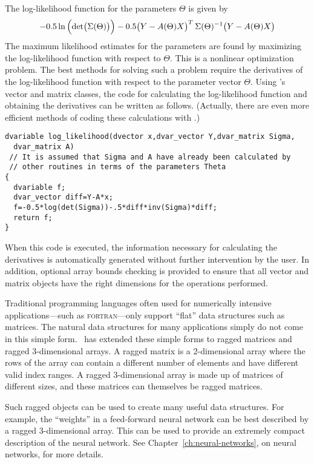 \documentclass{admbmanual}
\newcommand{\question}[1]{\bigskip\noindent{\bf #1?}\par\medskip\noindent}
\begin{document}
The log-likelihood function for the parameters $\Theta$ is given by
\begin{equation*}
  -0.5 \ln\Big(\mbox{\rm det}\big(\Sigma(\Theta)\big)\Big)-
   0.5\big(Y-A(\Theta)X\big)^T
   \,\Sigma(\Theta)^{-1}
   \big(Y-A(\Theta)X\big)
\end{equation*}
The maximum likelihood estimates for the parameters are found by maximizing the
log-likelihood function with respect to $\Theta$. This is a nonlinear
optimization problem. The best methods for solving such a problem require the
derivatives of the log-likelihood function with respect to the parameter vector
$\Theta$. Using \scAD's vector and matrix classes, the code for calculating the
log-likelihood function and obtaining the derivatives can be written as follows.
(Actually, there are even more efficient methods of coding these calculations
with \scAD.)

\begin{lstlisting}
dvariable log_likelihood(dvector x,dvar_vector Y,dvar_matrix Sigma,
  dvar_matrix A)
 // It is assumed that Sigma and A have already been calculated by
 // other routines in terms of the parameters Theta
{
  dvariable f;
  dvar_vector diff=Y-A*x;
  f=-0.5*log(det(Sigma))-.5*diff*inv(Sigma)*diff;
  return f;
}
\end{lstlisting}

When this code is executed, the information necessary for calculating the
derivatives is automatically generated without further intervention by the user.
In addition, optional array bounds checking is provided to ensure that all
vector and matrix objects have the right dimensions for the operations
performed.

\question{What are ragged arrays} Traditional programming languages often used
for numerically intensive applications---such as \textsc{fortran}---only support
``flat'' data structures such as matrices. The natural data structures for many
applications simply do not come in this simple form. \scAD\ has extended these
simple forms to ragged matrices and ragged 3-dimensional arrays. A ragged matrix
is a 2-dimensional array where the rows of the array can contain a different
number of elements and have different valid index ranges. A ragged 3-dimensional
array is made up of matrices of different sizes, and these matrices can
themselves be ragged matrices.

Such ragged objects can be used to create many useful data structures. For
example, the ``weights'' in a feed-forward neural network can be best described
by a ragged 3-dimensional array. This can be used to provide an extremely
compact description of the neural network. See Chapter~\ref{ch:neural-networks},
on neural networks, for more details.
\end{document}
